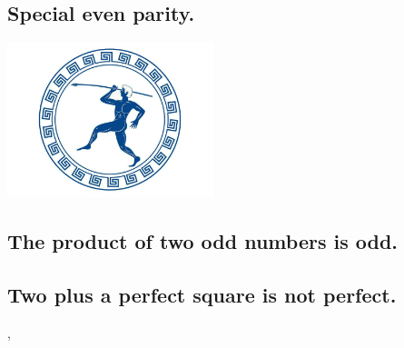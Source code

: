 \documentclass[preview]{standalone}
\begin{document}
\subsection{Special even parity.}

\begin{center}
    \includegraphics[width=6cm]{../resources/jpg/1.6.introduction.to.proofs/olympics.jpg}
\end{center}


\subsection{The product of two odd numbers is odd.}

\pagebreak


\subsection{Two plus a perfect square is not perfect.}

\vspace{1.5\baselineskip}
\sep
\pagebreak


\end{document}
